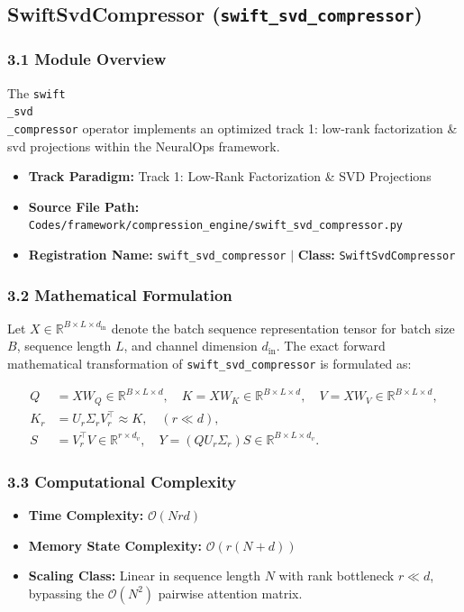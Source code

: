 \subsection{SwiftSvdCompressor (\texttt{swift\_svd\_compressor})}
\label{sec:app_module_swift_svd_compressor}

\subsubsection*{3.1 Module Overview}
The \texttt{swift\\_svd\\_compressor} operator implements an optimized track 1: low-rank factorization \& svd projections within the NeuralOps framework.
\begin{itemize}
    \item \textbf{Track Paradigm:} Track 1: Low-Rank Factorization & SVD Projections
    \item \textbf{Source File Path:} \texttt{Codes/framework/compression\_engine/swift\_svd\_compressor.py}
    \item \textbf{Registration Name:} \texttt{swift\_svd\_compressor} $\mid$ \textbf{Class:} \texttt{SwiftSvdCompressor}
\end{itemize}

\subsubsection*{3.2 Mathematical Formulation}
Let $X \in \mathbb{R}^{B \times L \times d_{\text{in}}}$ denote the batch sequence representation tensor for batch size $B$, sequence length $L$, and channel dimension $d_{\text{in}}$. The exact forward mathematical transformation of \texttt{swift\_svd\_compressor} is formulated as:

\begin{align}
Q &= X W_Q \in \mathbb{R}^{B \times L \times d}, \quad K = X W_K \in \mathbb{R}^{B \times L \times d}, \quad V = X W_V \in \mathbb{R}^{B \times L \times d}, \\
K_r &= U_r \Sigma_r V_r^\top \approx K, \quad (r \ll d), \\
S &= V_r^\top V \in \mathbb{R}^{r \times d_v}, \quad Y = (Q U_r \Sigma_r) S \in \mathbb{R}^{B \times L \times d_v}.
\end{align}


\subsubsection*{3.3 Computational Complexity}
\begin{itemize}
    \item \textbf{Time Complexity:} $\mathcal{O}(N r d)$
    \item \textbf{Memory State Complexity:} $\mathcal{O}(r(N + d))$
    \item \textbf{Scaling Class:} Linear in sequence length $N$ with rank bottleneck $r \ll d$, bypassing the $\mathcal{O}(N^2)$ pairwise attention matrix.
\end{itemize}

